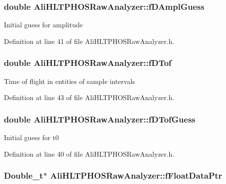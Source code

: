 \subsubsection{\setlength{\rightskip}{0pt plus 5cm}double {\bf Ali\-HLTPHOSRaw\-Analyzer::f\-DAmpl\-Guess}\hspace{0.3cm}{\tt  [protected, inherited]}}\label{classAliHLTPHOSRawAnalyzer_AliHLTPHOSRawAnalyzerPeakFinderp3}


Initial guess for amplitude 

Definition at line 41 of file Ali\-HLTPHOSRaw\-Analyzer.h.
\subsubsection{\setlength{\rightskip}{0pt plus 5cm}double {\bf Ali\-HLTPHOSRaw\-Analyzer::f\-DTof}\hspace{0.3cm}{\tt  [protected, inherited]}}\label{classAliHLTPHOSRawAnalyzer_AliHLTPHOSRawAnalyzerPeakFinderp5}


Time of flight in entities of sample intervals 

Definition at line 43 of file Ali\-HLTPHOSRaw\-Analyzer.h.
\subsubsection{\setlength{\rightskip}{0pt plus 5cm}double {\bf Ali\-HLTPHOSRaw\-Analyzer::f\-DTof\-Guess}\hspace{0.3cm}{\tt  [protected, inherited]}}\label{classAliHLTPHOSRawAnalyzer_AliHLTPHOSRawAnalyzerPeakFinderp2}


Initial guess for t0 

Definition at line 40 of file Ali\-HLTPHOSRaw\-Analyzer.h.
\subsubsection{\setlength{\rightskip}{0pt plus 5cm}Double\_\-t$\ast$ {\bf Ali\-HLTPHOSRaw\-Analyzer::f\-Float\-Data\-Ptr}\hspace{0.3cm}{\tt  [protected, inherited]}}\label{classAliHLTPHOSRawAnalyzer_AliHLTPHOSRawAnalyzerPeakFinderp0}



